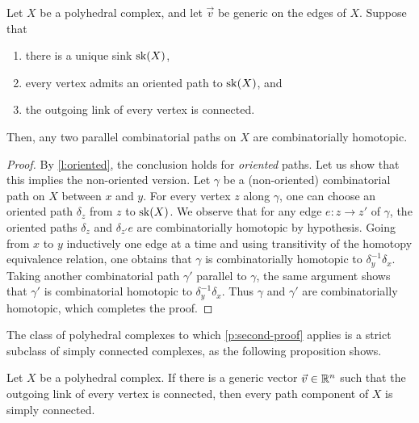 \begin{thm}
\label{p:second-proof}
    Let $X$ be a polyhedral complex, and let $\vec v$ be generic on the edges of $X$.
    Suppose that 
    \begin{enumerate}[label=\roman*)]
        \item there is a unique sink $\mathrm{sk}(X)$, 
        \item every vertex admits an oriented path to $\mathrm{sk}(X)$, and
        \item the outgoing link of every vertex is connected.
    \end{enumerate}
    Then, any two parallel combinatorial paths on $X$ are combinatorially homotopic.
\end{thm}

\begin{proof} 
    By \cref{l:oriented}, the conclusion holds for \emph{oriented} paths.  
    Let us show that this implies the non-oriented version.
    Let $\gamma$ be a (non-oriented) combinatorial path on $X$ between $x$ and $y$.
    For every vertex $z$ along $\gamma$, one can choose an oriented path $\delta_z$ from $z$ to $\mathrm{sk}(X)$. 
    We observe that for any edge $e: z \to z'$ of $\gamma$, the oriented paths $\delta_z$ and $\delta_{z'}e$ are combinatorially homotopic by hypothesis. 
    Going from $x$ to $y$ inductively one edge at a time and using transitivity of the homotopy equivalence relation, one obtains that $\gamma$ is combinatorially homotopic to $\delta_y^{-1}\delta_x$. 
    Taking another combinatorial path $\gamma'$ parallel to $\gamma$, the same argument shows that $\gamma'$ is combinatorial homotopic to $\delta_y^{-1}\delta_x$.
    Thus $\gamma$ and $\gamma'$ are combinatorially homotopic, which completes the proof. 
\end{proof}

The class of polyhedral complexes to which \cref{p:second-proof} applies is a strict subclass of simply connected complexes, as the following proposition shows.

\begin{proposition}
    \label{lemma:outgoing-link}
    Let $X$ be a polyhedral complex.
    If there is a generic vector $\vec v \in \mathbb R^n$ such that the outgoing link of every vertex is connected, then every path component of $X$ is simply connected.
\end{proposition}


